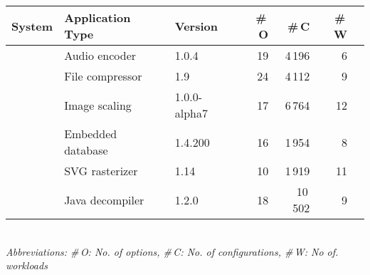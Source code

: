 \begin{tabular}{p{1.5cm}p{2.2cm}lrrrr}
		\toprule
		\textbf{System} &  \textbf{Application Type} & \textbf{Version} & \textbf{ \#\,O} & \textbf{\#\,C} & \textbf{\#\,W}  \\
		\midrule
		\jumper & Audio encoder & 1.0.4 & 19 & 4\,196 & 6   \\
		
		\kanzi & File compressor & 1.9 & 24 & 4\,112 & 9 \\
			
		\dconvert & Image scaling & 1.0.0-alpha7 & 17 & 6\,764 & 12  \\
				
		\htwo & Embedded database & 1.4.200 & 16 & 1\,954  & 8  \\
		
		\batik & SVG rasterizer & 1.14 & 10 & 1\,919 &  11  \\
		
		\jadx & Java decompiler & 1.2.0 & 18 & 10\,502 & 9  \\
\bottomrule

\end{tabular}\\
{\vspace{1mm}\textit{Abbreviations: \#\,O: No. of options, \#\,C: No. of configurations, \#\,W: No of. workloads}}
